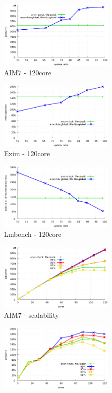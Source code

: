 \begin{figure}[t!]
    \centering
    \begin{subfigure}[b]{0.33\textwidth}
        \includegraphics[height=1.3in]{graph/ratio_aim7.eps}
        \caption{AIM7 - 120core}
    \end{subfigure}%
    \begin{subfigure}[b]{0.33\textwidth}
        \includegraphics[height=1.3in]{graph/ratio_exim.eps}
        \caption{Exim - 120core}
    \end{subfigure}
    \begin{subfigure}[b]{0.33\textwidth}
        \includegraphics[height=1.3in]{graph/ratio_lmbench.eps}
        \caption{Lmbench - 120core}
    \end{subfigure}
        \centering
    \begin{subfigure}[b]{0.33\textwidth}
        \includegraphics[height=1.3in]{graph/ratio_aim7_core.eps}
        \caption{AIM7 - scalability}
    \end{subfigure}%
    \begin{subfigure}[b]{0.33\textwidth}
        \includegraphics[height=1.3in]{graph/ratio_exim_core.eps}

\end{subfigure}
\end{figure}
